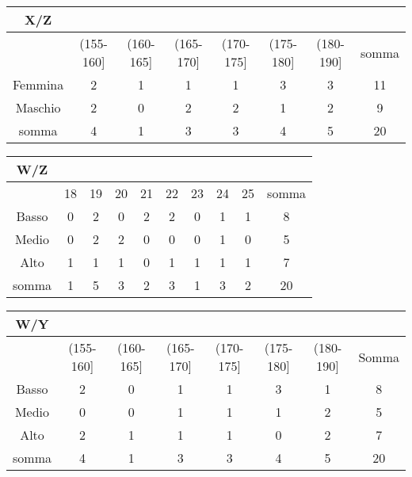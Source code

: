 \noindent
\begin{tabular}{|c|c|c|c|c|c|c|c|}
        \hline
        X/Z&&&&&&&\\ 
        \hline
&       {\scriptsize (155-160]}&        {\scriptsize (160-165]} 
&{\scriptsize (165-170]}&       {\scriptsize (170-175]} &{\scriptsize 
(175-180]}&     {\scriptsize (180-190]}&        {\scriptsize somma}\\
\hline 
Femmina&        2&      1&      1&      1&      3&      3&      11\\
\hline
Maschio&        2&      0&      2&      2&      1&      2&      9\\
\hline
somma&  4&      1&      3&      3&      4&      5&      20\\
        \hline
\end{tabular}

\noindent
\begin{tabular}{|c|c|c|c|c|c|c|c|c|c|}
        \hline
        W/Z&&&&&&&&&\\ 
        \hline
&       18&     19&     20&     21&     22&     23&     24&     25&     
somma\\ 
\hline
Basso&  0       &2&     0&      2       &2      &0      &1&1    &8\\
\hline
Medio & 0&      2&      2       &0&     0&      0       &1      &0&     5\\
\hline
Alto&   1&      1&      1&      0&      1&      1&      1&      1&      7\\
\hline
somma & 1&      5&      3&      2&      3       &1      &3      &2      
&20\\
\hline
\end{tabular}

\noindent
\begin{tabular}{|c|c|c|c|c|c|c|c|}
        \hline
        W/Y&&&&&&&\\ 
        \hline
&{\scriptsize   (155-160]}&     {\scriptsize (160-165]}&        
{\scriptsize (165-170]}&        {\scriptsize (170-175]} &{\scriptsize 
(175-180]}&     {\scriptsize (180-190]}&        {\scriptsize Somma}\\ 
\hline
Basso&  2&      0&      1&      1&      3&      1&      8\\
\hline
Medio & 0&      0&      1&      1&      1&      2&      5\\
\hline
Alto&   2&      1&      1&      1&      0&      2&      7\\
\hline
somma&  4&      1&      3&      3&      4&      5&      20\\
\hline
\end{tabular}

